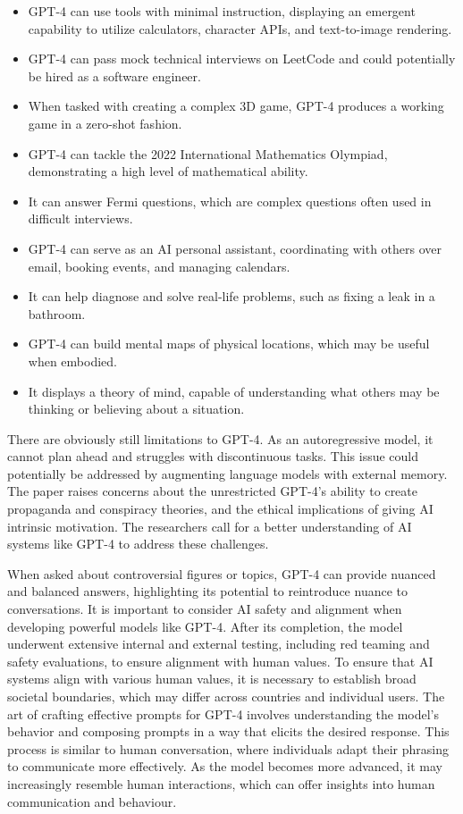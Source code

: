 \begin{itemize}
\item GPT-4 can use tools with minimal instruction, displaying an emergent capability to utilize calculators, character APIs, and text-to-image rendering.
\item  GPT-4 can pass mock technical interviews on LeetCode and could potentially be hired as a software engineer.
\item When tasked with creating a complex 3D game, GPT-4 produces a working game in a zero-shot fashion.
\item GPT-4 can tackle the 2022 International Mathematics Olympiad, demonstrating a high level of mathematical ability.
\item It can answer Fermi questions, which are complex questions often used in difficult interviews.
\item GPT-4 can serve as an AI personal assistant, coordinating with others over email, booking events, and managing calendars.
\item It can help diagnose and solve real-life problems, such as fixing a leak in a bathroom.
\item GPT-4 can build mental maps of physical locations, which may be useful when embodied.
\item It displays a theory of mind, capable of understanding what others may be thinking or believing about a situation.
\end{itemize}
There are obviously still limitations to GPT-4. As an autoregressive model, it cannot plan ahead and struggles with discontinuous tasks. This issue could potentially be addressed by augmenting language models with external memory. The paper raises concerns about the unrestricted GPT-4's ability to create propaganda and conspiracy theories, and the ethical implications of giving AI intrinsic motivation. The researchers call for a better understanding of AI systems like GPT-4 to address these challenges.\par
When asked about controversial figures or topics, GPT-4 can provide nuanced and balanced answers, highlighting its potential to reintroduce nuance to conversations. It is important to consider AI safety and alignment when developing powerful models like GPT-4. After its completion, the model underwent extensive internal and external testing, including red teaming and safety evaluations, to ensure alignment with human values. To ensure that AI systems align with various human values, it is necessary to establish broad societal boundaries, which may differ across countries and individual users. The art of crafting effective prompts for GPT-4 involves understanding the model's behavior and composing prompts in a way that elicits the desired response. This process is similar to human conversation, where individuals adapt their phrasing to communicate more effectively. As the model becomes more advanced, it may increasingly resemble human interactions, which can offer insights into human communication and behaviour. \par 
